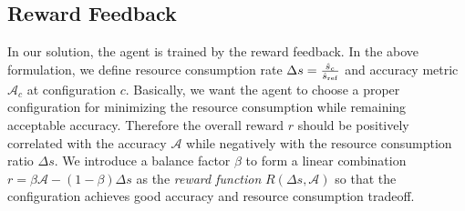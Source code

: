 \subsection{Reward Feedback}
\label{subsec: reward}

In our solution, the agent is trained by the reward feedback. In the above formulation, we define resource consumption rate $ \Delta s = \frac{\hat{s}_c}{\hat{s}_{\rm ref}} $ and accuracy metric $ \mathcal{A}_c $ at configuration $ c $. Basically, we want the agent to choose a proper configuration for minimizing the resource consumption while remaining acceptable accuracy. Therefore the overall reward $ r $ should be positively correlated with the accuracy $ \mathcal{A} $ while negatively with the resource consumption ratio $ \Delta s $. We introduce a balance factor $ \beta $ to form a linear combination $ r = \beta \mathcal{A} - (1-\beta) \Delta s  $ as the \emph{reward function} $ R(\Delta s, \mathcal{A}) $ so that the configuration achieves good accuracy and resource consumption tradeoff. %
